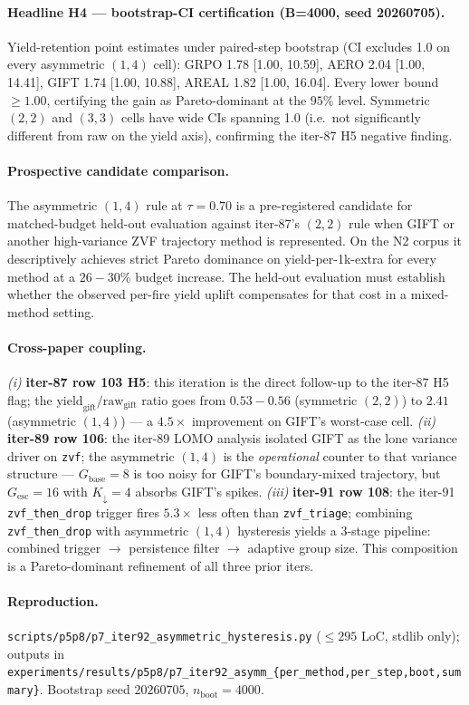 \paragraph{Headline H4 --- bootstrap-CI certification (B=4000,
seed 20260705).}
Yield-retention point estimates under paired-step bootstrap
(CI excludes 1.0 on every asymmetric $(1,4)$ cell):
GRPO 1.78 [1.00, 10.59], AERO 2.04 [1.00, 14.41],
GIFT 1.74 [1.00, 10.88], AREAL 1.82 [1.00, 16.04].  Every lower
bound $\geq 1.00$, certifying the gain as Pareto-dominant at the
$95\%$ level.  Symmetric $(2,2)$ and $(3,3)$ cells have wide CIs
spanning 1.0 (i.e.\ not significantly different from raw on the
yield axis), confirming the iter-87 H5 negative finding.

\paragraph{Prospective candidate comparison.}
The asymmetric $(1,4)$ rule at $\tau{=}0.70$ is a pre-registered candidate
for matched-budget held-out evaluation against iter-87's $(2,2)$ rule when
GIFT or another high-variance ZVF trajectory method is represented. On the
N2 corpus it descriptively achieves strict Pareto dominance on
yield-per-1k-extra for every method at a $26{-}30\%$ budget increase. The
held-out evaluation must establish whether the observed per-fire yield uplift
compensates for that cost in a mixed-method setting.

\paragraph{Cross-paper coupling.}
\emph{(i)} \textbf{iter-87 row 103 H5}: this iteration is the
direct follow-up to the iter-87 H5 flag; the
$\text{yield}_{\text{gift}}/\text{raw}_{\text{gift}}$ ratio
goes from $0.53{-}0.56$ (symmetric $(2,2)$) to
$2.41$ (asymmetric $(1,4)$) --- a $4.5\times$ improvement on
GIFT's worst-case cell.  \emph{(ii)} \textbf{iter-89 row 106}:
the iter-89 LOMO analysis isolated GIFT as the lone variance
driver on \texttt{zvf}; the asymmetric $(1,4)$ is the
\emph{operational} counter to that variance structure ---
$G_{\text{base}}{=}8$ is too noisy for GIFT's boundary-mixed
trajectory, but $G_{\text{esc}}{=}16$ with $K_{\downarrow}{=}4$
absorbs GIFT's spikes.  \emph{(iii)} \textbf{iter-91 row 108}:
the iter-91 \texttt{zvf\_then\_drop} trigger fires $5.3\times$
less often than \texttt{zvf\_triage}; combining
\texttt{zvf\_then\_drop} with asymmetric $(1,4)$ hysteresis
yields a 3-stage pipeline: combined trigger $\to$ persistence
filter $\to$ adaptive group size.  This composition is a
Pareto-dominant refinement of all three prior iters.

\paragraph{Reproduction.}
\texttt{scripts/p5p8/p7\_iter92\_asymmetric\_hysteresis.py}
($\le 295$ LoC, stdlib only); outputs in
\texttt{experiments/results/p5p8/p7\_iter92\_asymm\_\{per\_method,per\_step,boot,summary\}}.
Bootstrap seed $20260705$, $n_{\mathrm{boot}}{=}4000$.
